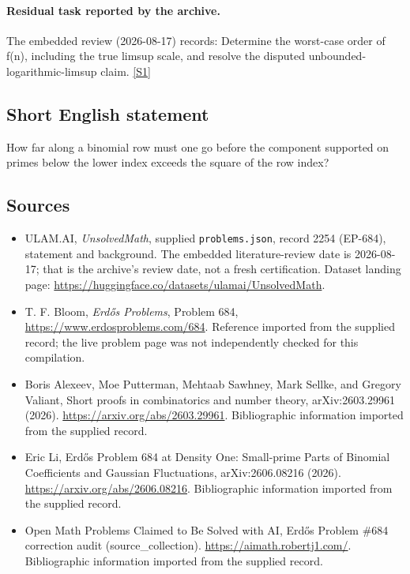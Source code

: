 \documentclass[11pt,a4paper]{article}
\newcommand{\sref}[2]{\hyperlink{source:#1:#2}{[S#2]}}
\begin{document}
\paragraph{Residual task reported by the archive.}

The embedded review (2026-08-17) records: Determine the worst-case order of f(n), including the true limsup scale, and resolve the disputed unbounded-logarithmic-limsup claim. \sref{2254}{1}

\subsection{Short English statement}

How far along a binomial row must one go before the component supported on primes below the lower index exceeds the square of the row index?

\subsection{Sources}

{\small

\begin{itemize}

\item[\hypertarget{source:2254:1}{S1}] ULAM.AI, \emph{UnsolvedMath}, supplied \texttt{problems.json}, record 2254 (EP-684), statement and background. The embedded literature-review date is 2026-08-17; that is the archive’s review date, not a fresh certification. Dataset landing page: \url{https://huggingface.co/datasets/ulamai/UnsolvedMath}.

\item[\hypertarget{source:2254:2}{S2}] T. F. Bloom, \emph{Erdős Problems}, Problem 684, \url{https://www.erdosproblems.com/684}. Reference imported from the supplied record; the live problem page was not independently checked for this compilation.

\item[\hypertarget{source:2254:3}{S3}] Boris Alexeev, Moe Putterman, Mehtaab Sawhney, Mark Sellke, and Gregory Valiant, Short proofs in combinatorics and number theory, arXiv:2603.29961 (2026). \url{https://arxiv.org/abs/2603.29961}. Bibliographic information imported from the supplied record.

\item[\hypertarget{source:2254:4}{S4}] Eric Li, Erdős Problem 684 at Density One: Small-prime Parts of Binomial Coefficients and Gaussian Fluctuations, arXiv:2606.08216 (2026). \url{https://arxiv.org/abs/2606.08216}. Bibliographic information imported from the supplied record.

\item[\hypertarget{source:2254:5}{S5}] Open Math Problems Claimed to Be Solved with AI, Erdős Problem \#684 correction audit (source\_collection). \url{https://aimath.robertj1.com/}. Bibliographic information imported from the supplied record.

\end{itemize}

}

\label{end:2254}
\end{document}
